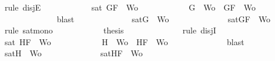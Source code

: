 \begin{isabellebody}
\ {\isacharparenleft}rule\ disjE{\isacharparenright}\isanewline
\ \ \ \ \ \ \ \ \ \ \isamarkupfalse%
\ {\isachardoublequoteopen}sat\ {\isacharparenleft}{\isacharbraceleft}G{\isacharcomma}F{\isacharbraceright}\ {\isasymunion}\ Wo{\isacharparenright}{\isachardoublequoteclose}\isanewline
\ \ \ \ \ \ \ \ \ \ \isamarkupfalse%
\ {\isachardoublequoteopen}{\isacharbraceleft}G{\isacharbraceright}\ {\isasymunion}\ Wo\ {\isasymsubseteq}\ {\isacharbraceleft}G{\isacharcomma}F{\isacharbraceright}\ {\isasymunion}\ Wo{\isachardoublequoteclose}\isanewline
\ \ \ \ \ \ \ \ \ \ \ \ \isamarkupfalse%
\ blast\isanewline
\ \ \ \ \ \ \ \ \ \ \isamarkupfalse%
\ \isamarkupfalse%
\ {\isachardoublequoteopen}sat{\isacharparenleft}{\isacharbraceleft}G{\isacharbraceright}\ {\isasymunion}\ Wo{\isacharparenright}{\isachardoublequoteclose}\isanewline
\ \ \ \ \ \ \ \ \ \ \ \ \isamarkupfalse%
\ {\isacartoucheopen}sat{\isacharparenleft}{\isacharbraceleft}G{\isacharcomma}F{\isacharbraceright}\ {\isasymunion}\ Wo{\isacharparenright}{\isacartoucheclose}\ \isamarkupfalse%
\ {\isacharparenleft}rule\ sat{\isacharunderscore}mono{\isacharparenright}\isanewline
\ \ \ \ \ \ \ \ \ \ \isamarkupfalse%
\ {\isacharquery}thesis\isanewline
\ \ \ \ \ \ \ \ \ \ \ \ \isamarkupfalse%
\ {\isacharparenleft}rule\ disjI{}{\isacharparenright}\isanewline
\ \ \ \ \ \ \ \ \isamarkupfalse%
\isanewline
\ \ \ \ \ \ \ \ \ \ \isamarkupfalse%
\ {\isachardoublequoteopen}sat\ {\isacharparenleft}{\isacharbraceleft}H{\isacharcomma}F{\isacharbraceright}\ {\isasymunion}\ Wo{\isacharparenright}{\isachardoublequoteclose}\isanewline
\ \ \ \ \ \ \ \ \ \ \isamarkupfalse%
\ {\isachardoublequoteopen}{\isacharbraceleft}H{\isacharbraceright}\ {\isasymunion}\ Wo\ {\isasymsubseteq}\ {\isacharbraceleft}H{\isacharcomma}F{\isacharbraceright}\ {\isasymunion}\ Wo{\isachardoublequoteclose}\isanewline
\ \ \ \ \ \ \ \ \ \ \ \ \isamarkupfalse%
\ blast\isanewline
\ \ \ \ \ \ \ \ \ \ \isamarkupfalse%
\ \isamarkupfalse%
\ {\isachardoublequoteopen}sat{\isacharparenleft}{\isacharbraceleft}H{\isacharbraceright}\ {\isasymunion}\ Wo{\isacharparenright}{\isachardoublequoteclose}\isanewline
\ \ \ \ \ \ \ \ \ \ \ \ \isamarkupfalse%
\ {\isacartoucheopen}sat{\isacharparenleft}{\isacharbraceleft}H{\isacharcomma}F{\isacharbraceright}\ {\isasymunion}\ Wo{\isacharparenright}{\isacartoucheclose}\ \isamarkupfalse%

\end{isabellebody}
